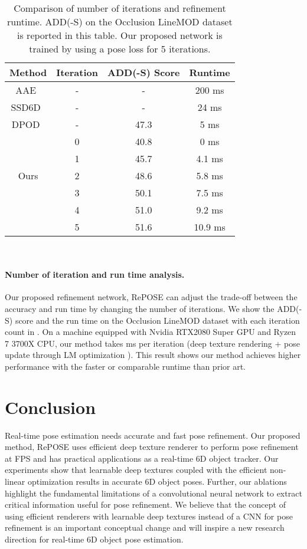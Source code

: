 \documentclass[10pt,twocolumn,letterpaper]{article}
\begin{document}
\begin{table}[t]
\caption{Comparison of number of iterations and refinement runtime. ADD(-S) on the Occlusion LineMOD dataset is reported in this table. Our proposed network is trained by using a pose loss for 5 iterations.}
\centering
\scalebox{1.0} {
\begin{tabular}{c|c||c|c}
  \hline
  Method & Iteration & ADD(-S) Score & Runtime \\ \hline
  AAE~\cite{Zakharov_2019_ICCV} & - & - & 200 ms \\
  SSD6D~\cite{Zakharov_2019_ICCV} & - & - & 24 ms \\
  DPOD~\cite{Zakharov_2019_ICCV} & - & 47.3 & 5 ms \\
\hline
  \multirow{5}{*}{Ours}
       & 0 & 40.8 & 0 ms  \\
       & 1 & 45.7 & 4.1 ms \\ & 2 & 48.6 & 5.8 ms \\ & 3 & 50.1 & 7.5 ms \\ & 4 & 51.0 & 9.2 ms \\
       & 5 & 51.6 & 10.9 ms \\ \hline
\end{tabular}
}
\label{tab:iteration_analysis}
\\\centering
\vspace*{1mm}
\end{table}

\paragraph{Number of iteration and run time analysis.}
Our proposed refinement network, RePOSE can adjust the trade-off between the accuracy and run time by changing the number of iterations.
We show the ADD(-S) score and the run time on the Occlusion LineMOD dataset with each iteration count in .
On a machine equipped with Nvidia RTX2080 Super GPU and Ryzen 7 3700X CPU, our method takes  ms per iteration (deep texture rendering + pose update through LM optimization \cite{10.1007/BFb0067700}). This result shows our method achieves higher performance with the faster or comparable runtime than prior art. 


\section{Conclusion}
Real-time pose estimation needs accurate and fast pose refinement. Our proposed method, RePOSE uses efficient deep texture renderer to perform pose refinement at  FPS and has practical applications as a real-time 6D object tracker. Our experiments show that learnable deep textures coupled with the efficient non-linear optimization results in accurate 6D object poses. Further, our ablations highlight the fundamental limitations of a convolutional neural network to extract critical information useful for pose refinement. We believe that the concept of using efficient renderers with learnable deep textures instead of a CNN for pose refinement is an important conceptual change and will inspire a new research direction for real-time 6D object pose estimation.
\end{document}
